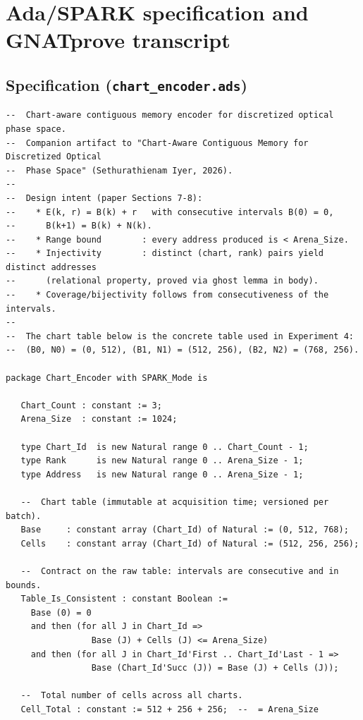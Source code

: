 \documentclass[11pt]{article}
\begin{document}
\appendix

\section{Ada/SPARK specification and GNATprove transcript}\label{app:ada}

\subsection{Specification (\texttt{chart\_encoder.ads})}

\begin{verbatim}
--  Chart-aware contiguous memory encoder for discretized optical phase space.
--  Companion artifact to "Chart-Aware Contiguous Memory for Discretized Optical
--  Phase Space" (Sethurathienam Iyer, 2026).
--
--  Design intent (paper Sections 7-8):
--    * E(k, r) = B(k) + r   with consecutive intervals B(0) = 0,
--      B(k+1) = B(k) + N(k).
--    * Range bound        : every address produced is < Arena_Size.
--    * Injectivity        : distinct (chart, rank) pairs yield distinct addresses
--      (relational property, proved via ghost lemma in body).
--    * Coverage/bijectivity follows from consecutiveness of the intervals.
--
--  The chart table below is the concrete table used in Experiment 4:
--  (B0, N0) = (0, 512), (B1, N1) = (512, 256), (B2, N2) = (768, 256).

package Chart_Encoder with SPARK_Mode is

   Chart_Count : constant := 3;
   Arena_Size  : constant := 1024;

   type Chart_Id  is new Natural range 0 .. Chart_Count - 1;
   type Rank      is new Natural range 0 .. Arena_Size - 1;
   type Address   is new Natural range 0 .. Arena_Size - 1;

   --  Chart table (immutable at acquisition time; versioned per batch).
   Base     : constant array (Chart_Id) of Natural := (0, 512, 768);
   Cells    : constant array (Chart_Id) of Natural := (512, 256, 256);

   --  Contract on the raw table: intervals are consecutive and in bounds.
   Table_Is_Consistent : constant Boolean :=
     Base (0) = 0
     and then (for all J in Chart_Id =>
                 Base (J) + Cells (J) <= Arena_Size)
     and then (for all J in Chart_Id'First .. Chart_Id'Last - 1 =>
                 Base (Chart_Id'Succ (J)) = Base (J) + Cells (J));

   --  Total number of cells across all charts.
   Cell_Total : constant := 512 + 256 + 256;  --  = Arena_Size


\end{verbatim}
\end{document}
